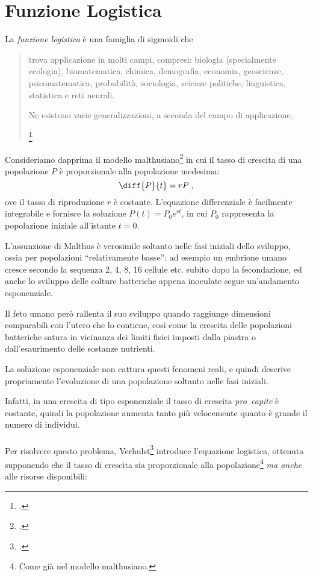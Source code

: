 \section{Funzione Logistica}
La \emph{funzione logistica} è una famiglia di sigmoidi che
\blockquote[\footcite{WENlogistic}]{\omissis trova applicazione in molti campi,
compresi: biologia (specialmente ecologia), biomatematica, chimica, demografia, economia,
geoscienze, psicomatematica, probabilità, sociologia, scienze politiche, linguistica,
statistica e reti neurali.

Ne esistono varie generalizzazioni, a seconda del campo di applicazione.}

\paragraph{}
Consideriamo dapprima il modello malthusiano\footcite{malthus1986essay} in cui il tasso di crescita di una popolazione $P$
è proporzionale alla popolazione medesima:
$$\diff{P}{t} = rP \; , $$
ove il tasso di riproduzione $r$ è costante. L'equazione differenziale è facilmente integrabile e fornisce la soluzione
$P(t) = P_0 e^{rt}$, in cui $P_0$ rappresenta la popolazione iniziale all'istante $t=0$.

L'assunzione di Malthus è verosimile soltanto nelle fasi iniziali dello sviluppo, ossia
per popolazioni ``relativamente basse'': ad esempio un embrione umano cresce secondo la sequenza
2, 4, 8, 16 cellule etc. subito dopo la fecondazione, ed anche lo sviluppo delle colture batteriche appena inoculate
segue un'andamento esponenziale.

Il feto umano però rallenta il suo sviluppo quando raggiunge dimensioni comparabili con l'utero che lo contiene, così
come la crescita delle popolazioni batteriche satura in vicinanza dei limiti fisici imposti dalla piastra o dall'esaurimento
delle sostanze nutrienti.

La soluzione esponenziale non cattura questi fenomeni reali, e quindi descrive propriamente l'evoluzione di una popolazione soltanto nelle fasi iniziali.

Infatti, in una crescita di tipo esponenziale il tasso di crescita \emph{pro~capite} è costante, quindi la popolazione
aumenta tanto più velocemente quanto è grande il numero di individui.

\paragraph{}
Per risolvere questo problema, Verhulst\footcite{verhulst} introduce l'equazione logistica,
ottenuta supponendo che il tasso di crescita sia proporzionale alla popolazione\footnote{Come già nel modello malthusiano.}
\emph{ma anche} alle risorse disponibili:

